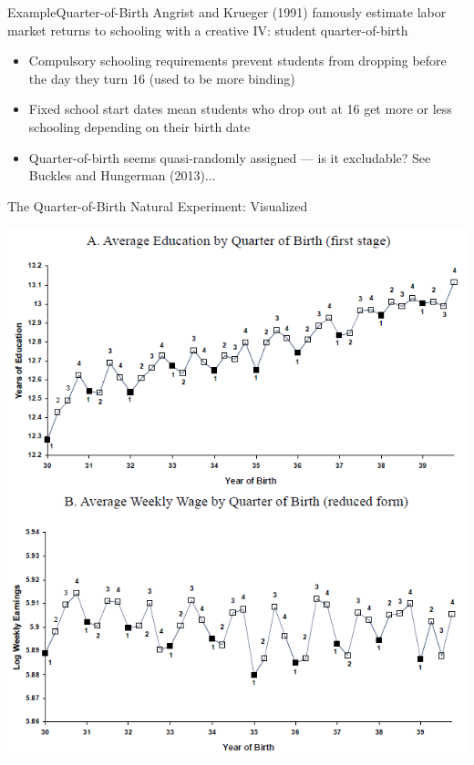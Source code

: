 \documentclass{beamer}
\begin{document}
\begin{frame}{Example}{Quarter-of-Birth}
Angrist and Krueger (1991) famously estimate labor market returns to schooling with a creative IV: student quarter-of-birth

\begin{itemize}
  \item Compulsory schooling requirements prevent students from dropping before the day they turn 16 (used to be more binding)

  \item Fixed school start dates mean students who drop out at 16 get more or less schooling depending on their birth date\pause

  \item Quarter-of-birth seems quasi-randomly assigned --- is it excludable? See Buckles and Hungerman (2013)...
\end{itemize}
\end{frame}

\begin{frame}{The Quarter-of-Birth Natural Experiment: Visualized}

\vspace{-0.5cm}
\begin{center}
\includegraphics[scale=0.45]{./lecture_includes/qob1.png}
\end{center}

\end{frame}
\end{document}
